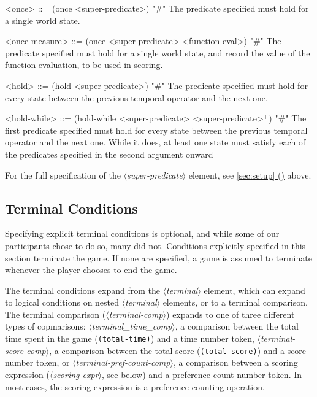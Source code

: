 \documentclass{article}
\newcommand{\dsl}[1]{{\it $\langle$#1$\rangle$}}
\newcommand*{\fullref}[1]{\hyperref[{#1}]{\autoref*{#1} (\nameref*{#1})}} %
\begin{document}
\begin{grammar}
<once> ::= (once <super-predicate>) "#" The predicate specified must hold for a single world state.

<once-measure> ::= (once <super-predicate> <function-eval>) "#" The predicate specified must hold for a single world state, and record the value of the function evaluation, to be used in scoring.

<hold> ::= (hold <super-predicate>) "#" The predicate specified must hold for every state between the previous temporal operator and the next one.

<hold-while> ::= (hold-while <super-predicate> <super-predicate>$^+$) "#" The first predicate specified must hold for every state between the previous temporal operator and the next one. While it does, at least one state must satisfy each of the predicates specified in the second argument onward



\end{grammar}
For the full specification of the \dsl{super-predicate} element, see \fullref{sec:setup} above.



\subsection{Terminal Conditions} \label{sec:terminal}
Specifying explicit terminal conditions is optional, and while some of our participants chose to do so, many did not.
Conditions explicitly specified in this section terminate the game.
If none are specified, a game is assumed to terminate whenever the player chooses to end the game.

The terminal conditions expand from the \dsl{terminal} element, which can expand to logical conditions on nested \dsl{terminal} elements, or to a terminal comparison.
The terminal comparison (\dsl{terminal-comp}) expands to one of three different types of copmarisons: \dsl{terminal_time_comp}, a comparison between the total time spent in the game (\lstinline{(total-time)}) and a time number token, \dsl{terminal-score-comp}, a comparison between the total score (\lstinline{(total-score)}) and a score number token, or \dsl{terminal-pref-count-comp}, a comparison between a scoring expression (\dsl{scoring-expr}, see below) and a preference count number token.
In most cases, the scoring expression is a preference counting operation.
\end{document}

